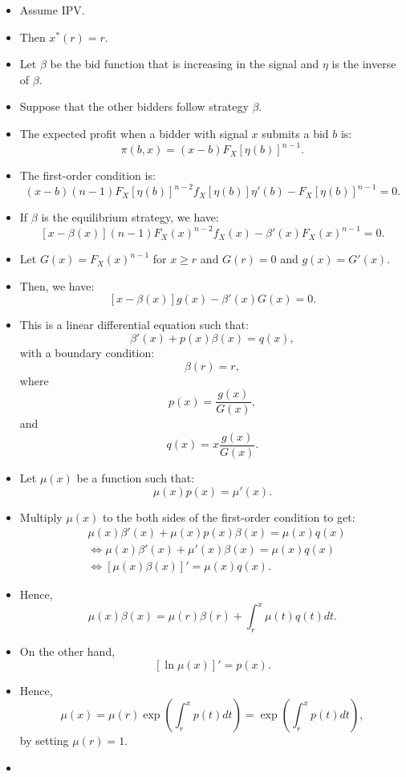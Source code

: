 \documentclass[
]{book}
\begin{document}
\begin{itemize}
\item
  Assume IPV.
\item
  Then \(x^*(r) = r\).
\item
  Let \(\beta\) be the bid function that is increasing in the signal and \(\eta\) is the inverse of \(\beta\).
\item
  Suppose that the other bidders follow strategy \(\beta\).
\item
  The expected profit when a bidder with signal \(x\) submits a bid \(b\) is:
  \[
  \pi(b, x) = (x - b) F_X[\eta(b)]^{n - 1}.
  \]
\item
  The first-order condition is:
  \[
  (x - b) (n - 1) F_X[\eta(b)]^{n - 2} f_X[\eta(b)] \eta'(b)- F_X[\eta(b)]^{n - 1} = 0.
  \]
\item
  If \(\beta\) is the equilibrium strategy, we have:
  \[
  [x - \beta(x)] (n - 1) F_X(x)^{n - 2} f_X(x) - \beta'(x) F_X(x)^{n - 1} = 0.
  \]
\item
  Let \(G(x) = F_X(x)^{n - 1}\) for \(x \ge r\) and \(G(r) = 0\) and \(g(x) = G'(x)\).
\item
  Then, we have:
  \[
  [x - \beta(x)] g(x) - \beta'(x) G(x) = 0.
  \]
\item
  This is a linear differential equation such that:
  \[
  \beta'(x) + p(x) \beta(x) = q(x),
  \]
  with a boundary condition:
  \[
  \beta(r) = r,
  \]
  where
  \[
  p(x) = \frac{g(x)}{G(x)},
  \]
  and
  \[
  q(x) = x \frac{g(x)}{G(x)}.
  \]
\item
  Let \(\mu(x)\) be a function such that:
  \[
  \mu(x) p(x) = \mu'(x).
  \]
\item
  Multiply \(\mu(x)\) to the both sides of the first-order condition to get:
  \[
  \begin{split}
  &\mu(x) \beta'(x) + \mu(x) p(x) \beta(x) = \mu(x) q(x)\\
  &\Leftrightarrow \mu(x) \beta'(x) + \mu'(x) \beta(x) = \mu(x) q(x)\\
  &\Leftrightarrow [\mu(x) \beta(x)]' = \mu(x) q(x).
  \end{split}
  \]
\item
  Hence,
  \[
  \mu(x) \beta(x) = \mu(r) \beta(r) + \int_{r}^x \mu(t) q(t) dt.
  \]
\item
  On the other hand,
  \[
  [\ln \mu(x)]' = p(x).
  \]
\item
  Hence,
  \[
  \mu(x) = \mu(r) \exp\left(\int_{r}^x p(t) dt  \right) = \exp\left(\int_{r}^x p(t) dt  \right),
  \]
  by setting \(\mu(r) = 1\).
\item

\end{itemize}
\end{document}
